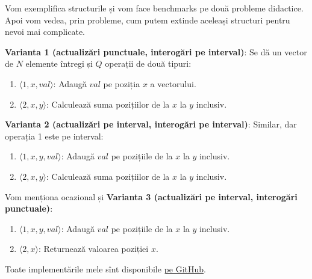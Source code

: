 \documentclass[../main.tex]{subfiles}
\begin{document}
Vom exemplifica structurile și vom face benchmarks pe două probleme didactice. Apoi vom vedea, prin probleme, cum putem extinde aceleași structuri pentru nevoi mai complicate.

\textbf{Varianta 1 (actualizări punctuale, interogări pe interval)}: Se dă un vector de $N$ elemente întregi și $Q$ operații de două tipuri:

\begin{enumerate}
  \item $\langle 1, x, val \rangle$: Adaugă $val$ pe poziția $x$ a vectorului.
  \item $\langle 2, x, y \rangle$: Calculează suma pozițiilor de la $x$ la $y$ inclusiv.
\end{enumerate}

\textbf{Varianta 2 (actualizări pe interval, interogări pe interval)}: Similar, dar operația 1 este pe interval:

\begin{enumerate}
  \item $\langle 1, x, y, val \rangle$: Adaugă $val$ pe pozițiile de la $x$ la $y$ inclusiv.
  \item $\langle 2, x, y \rangle$: Calculează suma pozițiilor de la $x$ la $y$ inclusiv.
\end{enumerate}

Vom menționa ocazional și \textbf{Varianta 3 (actualizări pe interval, interogări punctuale)}:

\begin{enumerate}
  \item $\langle 1, x, y, val \rangle$: Adaugă $val$ pe pozițiile de la $x$ la $y$ inclusiv.
  \item $\langle 2, x \rangle$: Returnează valoarea poziției $x$.
\end{enumerate}

Toate implementările mele sînt disponibile \href{https://github.com/CatalinFrancu/nerdvana/tree/main/query-update}{pe GitHub}.
\end{document}

